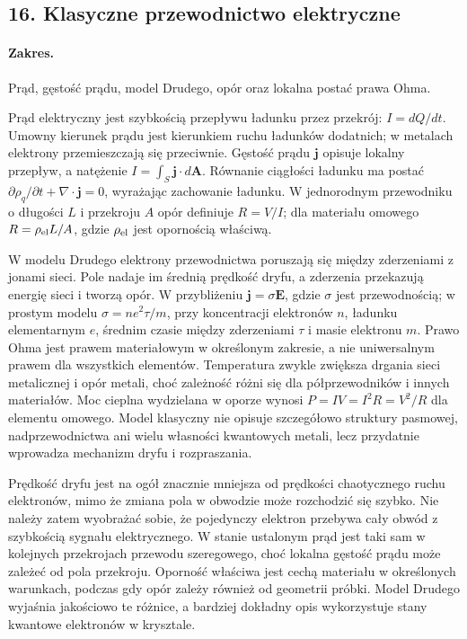 \documentclass[11pt,a4paper]{article}
\begin{document}
\subsection{16. Klasyczne przewodnictwo elektryczne}
\paragraph{Zakres.} Prąd, gęstość prądu, model Drudego, opór oraz lokalna postać prawa Ohma.

Prąd elektryczny jest szybkością przepływu ładunku przez przekrój: $I=dQ/dt$. Umowny kierunek prądu jest kierunkiem ruchu ładunków dodatnich; w metalach elektrony przemieszczają się przeciwnie. Gęstość prądu $\mathbf j$ opisuje lokalny przepływ, a natężenie $I=\int_S\mathbf j\cdot d\mathbf A$. Równanie ciągłości ładunku ma postać $\partial\rho_q/\partial t+\nabla\cdot\mathbf j=0$, wyrażając zachowanie ładunku. W jednorodnym przewodniku o długości $L$ i przekroju $A$ opór definiuje $R=V/I$; dla materiału omowego $R=\rho_{\rm el}L/A$, gdzie $\rho_{\rm el}$ jest opornością właściwą.

W modelu Drudego elektrony przewodnictwa poruszają się między zderzeniami z jonami sieci. Pole nadaje im średnią prędkość dryfu, a zderzenia przekazują energię sieci i tworzą opór. W przybliżeniu $\mathbf j=\sigma\mathbf E$, gdzie $\sigma$ jest przewodnością; w prostym modelu $\sigma=ne^2\tau/m$, przy koncentracji elektronów $n$, ładunku elementarnym $e$, średnim czasie między zderzeniami $\tau$ i masie elektronu $m$. Prawo Ohma jest prawem materiałowym w określonym zakresie, a nie uniwersalnym prawem dla wszystkich elementów. Temperatura zwykle zwiększa drgania sieci metalicznej i opór metali, choć zależność różni się dla półprzewodników i innych materiałów. Moc cieplna wydzielana w oporze wynosi $P=IV=I^2R=V^2/R$ dla elementu omowego. Model klasyczny nie opisuje szczegółowo struktury pasmowej, nadprzewodnictwa ani wielu własności kwantowych metali, lecz przydatnie wprowadza mechanizm dryfu i rozpraszania.

Prędkość dryfu jest na ogół znacznie mniejsza od prędkości chaotycznego ruchu elektronów, mimo że zmiana pola w obwodzie może rozchodzić się szybko. Nie należy zatem wyobrażać sobie, że pojedynczy elektron przebywa cały obwód z szybkością sygnału elektrycznego. W stanie ustalonym prąd jest taki sam w kolejnych przekrojach przewodu szeregowego, choć lokalna gęstość prądu może zależeć od pola przekroju. Oporność właściwa jest cechą materiału w określonych warunkach, podczas gdy opór zależy również od geometrii próbki. Model Drudego wyjaśnia jakościowo te różnice, a bardziej dokładny opis wykorzystuje stany kwantowe elektronów w krysztale.
\end{document}
